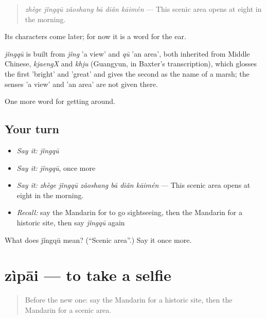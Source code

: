 \begin{quote}
\emph{zhège jǐngqū zǎoshang bā diǎn kāimén} — This scenic area opens at eight in the morning.
\end{quote}

Its characters come later; for now it is a word for the ear.

\begin{cousinweb}
\emph{jǐngqū} is built from \emph{jǐng} 'a view' and \emph{qū} 'an area', both inherited from Middle Chinese, \emph{kjaengX} and \emph{khju} (Guangyun, in Baxter's transcription), which glosses the first 'bright' and 'great' and gives the second as the name of a marsh; the senses 'a view' and 'an area' are not given there.
\end{cousinweb}

\begin{grammarlens}[title={What you've built}]
One more word for getting around.
\end{grammarlens}

\subsection*{Your turn}
\begin{itemize}
\raggedright
  \item \emph{Say it:} \emph{jǐngqū}
  \item \emph{Say it:} \emph{jǐngqū}, once more
  \item \emph{Say it:} \emph{zhège jǐngqū zǎoshang bā diǎn kāimén} — This scenic area opens at eight in the morning.
  \item \emph{Recall:} say the Mandarin for to go sightseeing, then the Mandarin for a historic site, then say \emph{jǐngqū} again
\end{itemize}

\begin{tcolorbox}[breakable,colback=teal!4,colframe=teal!35!black,title={Before you move on}]
What does jǐngqū mean? (\textquotedblleft{}Scenic area\textquotedblright{}.) Say it once more.
\end{tcolorbox}
\section[zìpāi]{zìpāi — to take a selfie}

\label{lesson:ZH-C430-zipai}



\begin{quote}
Before the new one: say the Mandarin for a historic site, then the Mandarin for a scenic area.
\end{quote}

